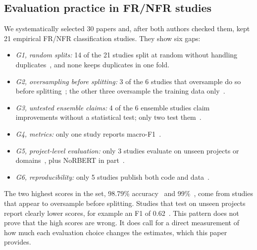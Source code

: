 \subsection{Evaluation practice in FR/NFR studies}

We systematically selected 30 papers and, after both authors checked them, kept 21 empirical FR/NFR classification studies. They show six gaps:
\begin{itemize}
\item \emph{G1, random splits:} 14 of the 21 studies split at random without handling duplicates~\cite{toth2019comparative,abad2017what,baskoro2021systematic,metu2024hybrid,kiani2026deep}, and none keeps duplicates in one fold.
\item \emph{G2, oversampling before splitting:} 3 of the 6 studies that oversample do so before splitting~\cite{kiani2026deep,baskoro2021systematic,metu2024hybrid}; the other three oversample the training data only~\cite{hey2020norbert,rahimi2021phase,or2025improving}.
\item \emph{G3, untested ensemble claims:} 4 of the 6 ensemble studies claim improvements without a statistical test; only two test them~\cite{kiani2026deep,kadhim2026enhancing}.
\item \emph{G4, metrics:} only one study reports macro-F1~\cite{binkhonain2025prompts}.
\item \emph{G5, project-level evaluation:} only 3 studies evaluate on unseen projects or domains~\cite{tahir2025cross,ali2025multi,martin2025evaluating}, plus NoRBERT in part~\cite{hey2020norbert}.
\item \emph{G6, reproducibility:} only 5 studies publish both code and data~\cite{tahir2025cross,hey2020norbert,alhoshan2023zero,eltahier2025bert,martin2025evaluating}.
\end{itemize}
The two highest scores in the set, 98.79\% accuracy~\cite{metu2024hybrid} and 99\%~\cite{baskoro2021systematic}, come from studies that appear to oversample before splitting. Studies that test on unseen projects report clearly lower scores, for example an F1 of 0.62~\cite{martin2025evaluating}. This pattern does not prove that the high scores are wrong. It does call for a direct measurement of how much each evaluation choice changes the estimates, which this paper provides.
